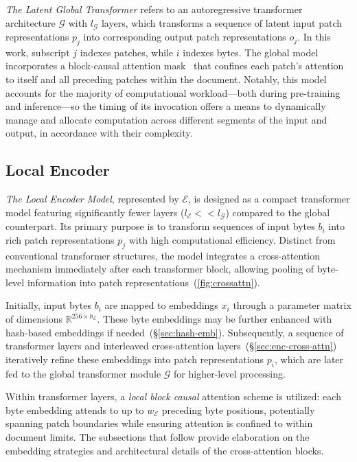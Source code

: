 \textit{The Latent Global Transformer} refers to an autoregressive transformer architecture $\mathcal{G}$ with $l_{\mathcal{G}}$ layers, which transforms a sequence of latent input patch representations $p_j$ into corresponding output patch representations $o_j$. In this work, subscript $j$ indexes patches, while $i$ indexes bytes. The global model incorporates a block-causal attention mask~\citep{dubey2024llama} that confines each patch's attention to itself and all preceding patches within the document. Notably, this model accounts for the majority of computational workload—both during pre-training and inference—so the timing of its invocation offers a means to dynamically manage and allocate computation across different segments of the input and output, in accordance with their complexity.

\subsection{Local Encoder}
\label{section:local}

\textit{The Local Encoder Model}, represented by $\mathcal{E}$, is designed as a compact transformer model featuring significantly fewer layers ($l_{\mathcal{E}} << l_{\mathcal{G}}$) compared to the global counterpart. Its primary purpose is to transform sequences of input bytes $b_i$ into rich patch representations $p_j$ with high computational efficiency. Distinct from conventional transformer structures, the model integrates a cross-attention mechanism immediately after each transformer block, allowing pooling of byte-level information into patch representations~(\autoref{fig:crossattn}).

Initially, input bytes $b_i$ are mapped to embeddings $x_i$ through a parameter matrix of dimensions $\mathbb{R}^{256 \times h_{\mathcal{E}}}$. These byte embeddings may be further enhanced with hash-based embeddings if needed~(\S\ref{sec:hash-emb}). Subsequently, a sequence of transformer layers and interleaved cross-attention layers~(\S\ref{sec:enc-cross-attn}) iteratively refine these embeddings into patch representations $p_i$, which are later fed to the global transformer module $\mathcal{G}$ for higher-level processing.

Within transformer layers, a \textit{local block causal} attention scheme is utilized: each byte embedding attends to up to $w_{\mathcal{E}}$ preceding byte positions, potentially spanning patch boundaries while ensuring attention is confined to within document limits. The subsections that follow provide elaboration on the embedding strategies and architectural details of the cross-attention blocks.

